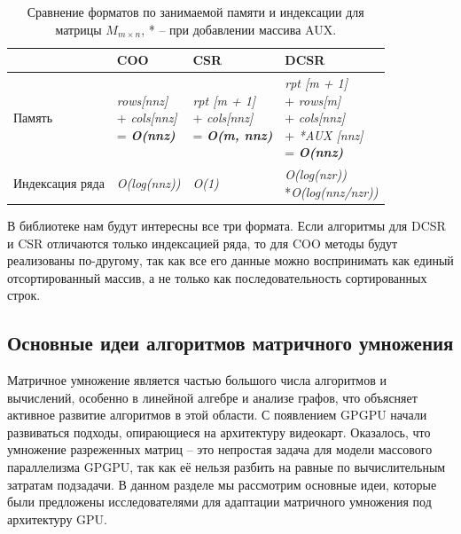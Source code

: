 \documentclass[14pt]{extarticle}
\newcommand{\txt}{\textit}
\newcommand{\bld}{\textbf}
\begin{document}
		\begin{table}
			\centering
			\begin{tabular}{ |p{2.6cm} |p{3cm}|p{3cm}|p{3.5cm}| } 
				\hline
				       & COO & CSR & DCSR \\ 
				\hline
				Память & \makecell[tl]{ \txt{rows[nnz]} \\  + \txt{cols[nnz]} \\ = \txt{\bld{O(nnz)}}}
					   & \makecell[tl]{ \txt{rpt [m + 1]} \\ + \txt{cols[nnz]} \\ =  \txt{\bld{O(m, nnz)}}} 
					   & \makecell[tl]{ \txt{rpt [m + 1]} \\ + \txt{rows[m]} \\ + \txt{cols[nnz]} \\ + \txt{*AUX [nnz]} \\ = \txt{\bld{O(nnz)}}} \\ 
				\hline
				Индексация ряда  & \txt{O(log(nnz))} & \txt{O(1)} & \makecell[tl]{ \txt{O(log(nzr))} \\ *\txt{O(log(nnz/nzr))}} \\ 
				\hline
			\end{tabular}
			\caption{Сравнение форматов по занимаемой памяти и индексации для матрицы $M_{m\times n}$, * -- при добавлении массива AUX.}
			\label{formats}
		\end{table}
		
	В библиотеке нам будут интересны все три формата. Если алгоритмы для DCSR и CSR отличаются только индексацией ряда, то для COO методы будут реализованы по-другому, так как все его данные можно воспринимать как единый отсортированный массив, а не только как последовательность сортированных строк.
	
	
	\subsection{Основные идеи алгоритмов матричного умножения}
	
	Матричное умножение является частью большого числа алгоритмов и вычислений, особенно в линейной алгебре и анализе графов, что объясняет активное развитие алгоритмов в этой области. С появлением GPGPU начали развиваться подходы, опирающиеся на архитектуру видеокарт. Оказалось, что умножение разреженных матриц -- это непростая задача для модели массового параллелизма GPGPU, так как её нельзя разбить на равные по вычислительным затратам подзадачи. В данном разделе мы рассмотрим основные идеи, которые были предложены исследователями для адаптации матричного умножения под архитектуру GPU. 
	
\end{document}
